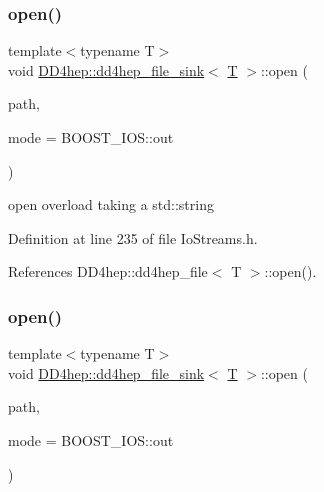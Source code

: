 \subsubsection{\texorpdfstring{open()}{open()}\hspace{0.1cm}{\footnotesize\ttfamily [2/4]}}
{\footnotesize\ttfamily template$<$typename T$>$ \\
void \hyperlink{class_d_d4hep_1_1dd4hep__file__sink}{D\+D4hep\+::dd4hep\+\_\+file\+\_\+sink}$<$ \hyperlink{class_t}{T} $>$\+::open (\begin{DoxyParamCaption}\item[{const std\+::string \&}]{path,  }\item[{B\+O\+O\+S\+T\+\_\+\+I\+O\+S\+::openmode}]{mode = {\ttfamily BOOST\+\_\+IOS\+:\+:out} }\end{DoxyParamCaption})\hspace{0.3cm}{\ttfamily [inline]}}



open overload taking a std\+::string 



Definition at line 235 of file Io\+Streams.\+h.



References D\+D4hep\+::dd4hep\+\_\+file$<$ T $>$\+::open().

\hypertarget{class_d_d4hep_1_1dd4hep__file__sink_aae7af8ee1e98ae89b380ddf2dc3f51f9}{}\label{class_d_d4hep_1_1dd4hep__file__sink_aae7af8ee1e98ae89b380ddf2dc3f51f9} 
\subsubsection{\texorpdfstring{open()}{open()}\hspace{0.1cm}{\footnotesize\ttfamily [3/4]}}
{\footnotesize\ttfamily template$<$typename T$>$ \\
void \hyperlink{class_d_d4hep_1_1dd4hep__file__sink}{D\+D4hep\+::dd4hep\+\_\+file\+\_\+sink}$<$ \hyperlink{class_t}{T} $>$\+::open (\begin{DoxyParamCaption}\item[{const char $\ast$}]{path,  }\item[{B\+O\+O\+S\+T\+\_\+\+I\+O\+S\+::openmode}]{mode = {\ttfamily BOOST\+\_\+IOS\+:\+:out} }\end{DoxyParamCaption})\hspace{0.3cm}{\ttfamily [inline]}}



